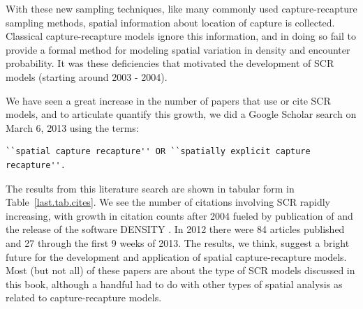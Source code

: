 With these new sampling techniques, like many commonly used
capture-recapture sampling methods,
spatial information about location of capture is
collected. %
Classical capture-recapture models ignore this information, and in
doing so fail to provide a formal method for modeling spatial
variation in density and encounter
probability. %
It was these deficiencies that motivated %
the development of SCR models (starting around
2003 - 2004).

We have seen a great increase in the number of papers that use or cite SCR models, and to
articulate quantify this growth,
we did a Google Scholar search on
March 6, 2013 using the terms:
\begin{small}
\begin{verbatim}
``spatial capture recapture'' OR ``spatially explicit capture recapture''.
\end{verbatim}
\end{small}
The results from this literature search are shown
in tabular form in Table~\ref{last.tab.cites}.
We see the number of citations involving SCR rapidly increasing,
with growth in citation counts after 2004 fueled by publication of
\citet{efford:2004} and the release of the software DENSITY
\citep{efford_etal:2004}. In 2012 there were 84 articles published and
27 through the first 9 weeks of 2013.
The results, we think, suggest a bright future
for the development and application of spatial capture-recapture
models. Most (but not all) of these papers are about the type of SCR models
discussed in this book, although a handful had to
do with other types of spatial analysis as related to
capture-recapture models.

